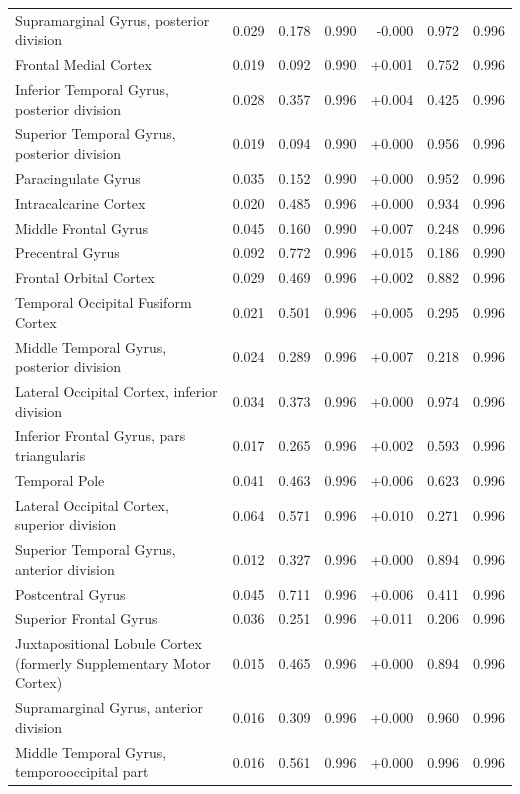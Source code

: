 \documentclass[11pt]{article}
\begin{document}
{\begin{longtable}{>{\raggedright\arraybackslash}p{6.4cm}rrrrrr}
Supramarginal Gyrus, posterior division & 0.029 & 0.178 & 0.990 & -0.000 & 0.972 & 0.996 \\
Frontal Medial Cortex & 0.019 & 0.092 & 0.990 & +0.001 & 0.752 & 0.996 \\
Inferior Temporal Gyrus, posterior division & 0.028 & 0.357 & 0.996 & +0.004 & 0.425 & 0.996 \\
Superior Temporal Gyrus, posterior division & 0.019 & 0.094 & 0.990 & +0.000 & 0.956 & 0.996 \\
Paracingulate Gyrus & 0.035 & 0.152 & 0.990 & +0.000 & 0.952 & 0.996 \\
Intracalcarine Cortex & 0.020 & 0.485 & 0.996 & +0.000 & 0.934 & 0.996 \\
Middle Frontal Gyrus & 0.045 & 0.160 & 0.990 & +0.007 & 0.248 & 0.996 \\
Precentral Gyrus & 0.092 & 0.772 & 0.996 & +0.015 & 0.186 & 0.990 \\
Frontal Orbital Cortex & 0.029 & 0.469 & 0.996 & +0.002 & 0.882 & 0.996 \\
Temporal Occipital Fusiform Cortex & 0.021 & 0.501 & 0.996 & +0.005 & 0.295 & 0.996 \\
Middle Temporal Gyrus, posterior division & 0.024 & 0.289 & 0.996 & +0.007 & 0.218 & 0.996 \\
Lateral Occipital Cortex, inferior division & 0.034 & 0.373 & 0.996 & +0.000 & 0.974 & 0.996 \\
Inferior Frontal Gyrus, pars triangularis & 0.017 & 0.265 & 0.996 & +0.002 & 0.593 & 0.996 \\
Temporal Pole & 0.041 & 0.463 & 0.996 & +0.006 & 0.623 & 0.996 \\
Lateral Occipital Cortex, superior division & 0.064 & 0.571 & 0.996 & +0.010 & 0.271 & 0.996 \\
Superior Temporal Gyrus, anterior division & 0.012 & 0.327 & 0.996 & +0.000 & 0.894 & 0.996 \\
Postcentral Gyrus & 0.045 & 0.711 & 0.996 & +0.006 & 0.411 & 0.996 \\
Superior Frontal Gyrus & 0.036 & 0.251 & 0.996 & +0.011 & 0.206 & 0.996 \\
Juxtapositional Lobule Cortex (formerly Supplementary Motor Cortex) & 0.015 & 0.465 & 0.996 & +0.000 & 0.894 & 0.996 \\
Supramarginal Gyrus, anterior division & 0.016 & 0.309 & 0.996 & +0.000 & 0.960 & 0.996 \\
Middle Temporal Gyrus, temporooccipital part & 0.016 & 0.561 & 0.996 & +0.000 & 0.996 & 0.996 \\

\end{longtable}}
\end{document}
